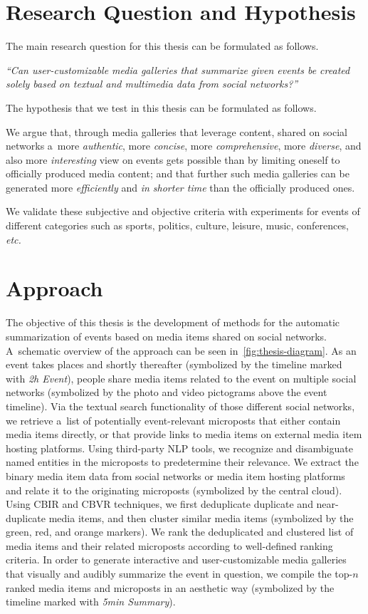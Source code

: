 \section{Research Question and Hypothesis}

The main research question for this thesis
can be formulated as follows.
 
\textit{``Can user-customizable
media galleries that summarize given events be
created solely based on textual and multimedia data
from social networks?''}

\noindent The hypothesis that we test in this thesis
can be formulated as follows.

We argue that,
through media galleries that leverage content,
shared on social networks
a~more \emph{authentic}, more \emph{concise},
more \emph{comprehensive}, more \emph{diverse},
and also more \emph{interesting}
view on events gets possible than by limiting oneself
to officially produced media content;
and that further such media galleries can be generated
more \emph{efficiently} and \emph{in shorter time}
than the officially produced ones.

We validate these subjective and objective
criteria with experiments for events of different categories
such as sports, politics, culture, leisure,
music, conferences, \emph{etc.}

\section{Approach}

The objective of this thesis is the development
of methods for the automatic summarization of events
based on media items shared on social networks.
A~schematic overview of the approach can be seen
in~\autoref{fig:thesis-diagram}.
As an event takes places and shortly thereafter
(symbolized by the timeline marked with \emph{2h Event}),
people share media items related to the event
on multiple social networks
(symbolized by the photo and video pictograms
above the event timeline).
Via the textual search functionality of those
different social networks,
we retrieve a~list of potentially event-relevant
microposts that either contain media items directly,
or that provide links to media items
on external media item hosting platforms.
Using third-party NLP tools,
we recognize and disambiguate named entities
in the microposts to predetermine their relevance.
We extract the binary media item data
from social networks or media item hosting platforms
and relate it to the originating microposts
(symbolized by the central cloud).
Using CBIR and CBVR techniques, we first deduplicate
duplicate and near-duplicate media items,
and then cluster similar media items
(symbolized by the green, red, and orange markers).
We rank the deduplicated and clustered list
of media items and their related microposts
according to well-defined ranking criteria.
In order to generate interactive and user-customizable
media galleries that visually and audibly summarize the
event in question, we compile the top-$n$ ranked
media items and microposts in an aesthetic way
(symbolized by the timeline marked with \emph{5min Summary}).

